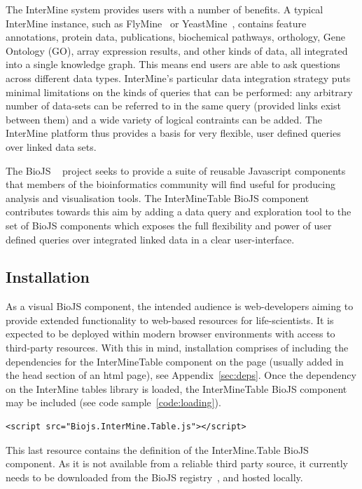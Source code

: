 \documentclass[10pt,a4paper,twocolumn]{article}
\begin{document}
The InterMine system provides users with a number of benefits. A typical
InterMine instance, such as FlyMine~\cite{flymine} or
YeastMine~\cite{yeastmine}, contains feature annotations, protein data,
publications, biochemical pathways, orthology, Gene Ontology (GO), array
expression results, and other kinds of data, all integrated into a single
knowledge graph. This means end users are able to ask questions across different
data types. InterMine's particular data integration strategy puts minimal
limitations on the kinds of queries that can be performed: any arbitrary number
of data-sets can be referred to in the same query (provided links exist between
them) and a wide variety of logical contraints can be added. The InterMine
platform thus provides a basis for very flexible, user defined
queries over linked data sets. 

The BioJS ~\cite{biojs} project seeks to provide a suite of reusable Javascript
components that members of the bioinformatics community will find useful for
producing analysis and visualisation tools. The InterMineTable BioJS component
contributes towards this aim by adding a data query and exploration tool to the
set of BioJS components which exposes the full flexibility and power of user
defined queries over integrated linked data in a clear user-interface.

\subsection*{Installation}

As a visual BioJS component, the intended audience is web-developers aiming to
provide extended functionality to web-based resources for life-scientists. It is
expected to be deployed within modern browser environments with access to third-party
resources. With this in mind, installation comprises of including the dependencies for
the InterMineTable component on the page (usually added in the head section
of an html page), see Appendix~\ref{sec:deps}. Once the dependency on the InterMine 
tables library is loaded, the InterMineTable BioJS component may be included (see 
code sample~\ref{code:loading}).

\begin{lstlisting}[caption={Loading the BioJS InterMine Table library}, label={code:loading}]
<script src="Biojs.InterMine.Table.js"></script>
\end{lstlisting}

This last resource contains the definition of the InterMine.Table BioJS
component. As it is not available from a reliable third party source, it
currently needs to be downloaded from the BioJS
registry~\cite{site:biojs-registry}, and hosted locally.
\end{document}
